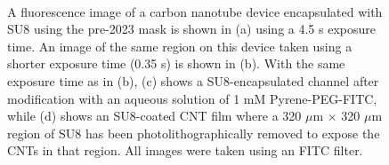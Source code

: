 \documentclass[
  a4paper,
]{scrbook}
\begin{document}
\begin{figure}
\begin{minipage}[t]{0.47\linewidth}
{{}

}

\subcaption{\label{fig-350ms-SU8-FITC}}
\end{minipage}%
%
\begin{minipage}[t]{0.05\linewidth}

{\centering 

~

}

\end{minipage}%
%
\begin{minipage}[t]{0.47\linewidth}

{\centering 


}

\subcaption{\label{fig-SU8-FITC-CNT}}
\end{minipage}%

\caption{\label{fig-FITC-SU8}A fluorescence image of a carbon nanotube
device encapsulated with SU8 using the pre-2023 mask is shown in (a)
using a 4.5 s exposure time. An image of the same region on this device
taken using a shorter exposure time (0.35 s) is shown in (b). With the
same exposure time as in (b), (c) shows a SU8-encapsulated channel after
modification with an aqueous solution of 1 mM Pyrene-PEG-FITC, while (d)
shows an SU8-coated CNT film where a 320 \(\mu\)m \(\times\) 320
\(\mu\)m region of SU8 has been photolithographically removed to expose
the CNTs in that region. All images were taken using an FITC filter.}

\end{figure}
\end{document}
